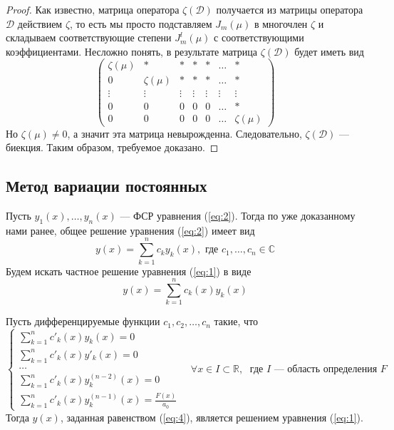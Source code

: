 \documentclass[11pt]{article}
\begin{document}
\begin{proof}
    Как известно, матрица оператора $\zeta(\mathcal{D})$ получается из матрицы оператора $\mathcal{D}$ действием $\zeta$, то есть мы просто подставляем $J_m(\mu)$ в многочлен $\zeta$ и складываем соответствующие степени $J_m^l(\mu)$ с соответствующими коэффициентами. Несложно понять, в результате матрица $\zeta(\mathcal{D})$ будет иметь вид 
    \begin{equation*}
        \begin{pmatrix}
            \zeta(\mu) & \ast & \ast & \ast & \ast & \ldots & \ast \\
            0 & \zeta(\mu) & \ast & \ast & \ast & \ldots & \ast \\
            \vdots & \vdots & \vdots & \vdots & \vdots & \vdots & \vdots \\
            0 & 0 & 0 & 0 & 0 & \ldots & \ast \\
            0 & 0 & 0 & 0 & 0 & \ldots & \zeta(\mu)
        \end{pmatrix}
    \end{equation*}
    Но $\zeta(\mu) \neq 0$, а значит эта матрица невырожденна. Следовательно, $\zeta(\mathcal{D})$ --- биекция. Таким образом, требуемое доказано.
\end{proof}

\subsection{Метод вариации постоянных}

Пусть $y_1(x), \ldots, y_n(x)$ --- ФСР уравнения (\ref{eq:2}). Тогда по уже доказанному нами ранее, общее решение уравнения (\ref{eq:2}) имеет вид 
\[y(x) = \sum_{k = 1}^n c_k y_k(x), \text{ где } c_1, \ldots, c_n \in \mathbb{C}\]
Будем искать частное решение уравнения (\ref{eq:1}) в виде 
\begin{equation} \label{eq:4}
    y(x) = \sum_{k = 1}^n c_k(x) y_k(x)
\end{equation}

\begin{theorem}
    Пусть дифференцируемые функции $c_1, c_2, \ldots, c_n$ такие, что 
    \begin{equation*} \label{eq:ast} \tag{$\ast$}
        \begin{cases}
            \sum_{k = 1}^n c'_k(x) y_k(x) = 0 \\
            \sum_{k = 1}^n c'_k(x) y'_k(x) = 0 \\
            \ldots \\ 
            \sum_{k = 1}^n c'_k(x) y^{(n - 2)}_k(x) = 0 \\
            \sum_{k = 1}^n c'_k(x) y^{(n - 1)}_k(x) = \frac{F(x)}{a_0}
        \end{cases}
        \quad \forall x \in I \subset \mathbb{R}, \; \text{ где } I \text{ --- область определения } F
    \end{equation*}
    Тогда $y(x)$, заданная равенством (\ref{eq:4}), является решением уравнения (\ref{eq:1}).
\end{theorem}
\end{document}
